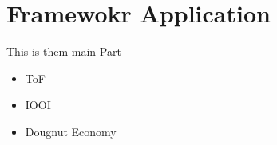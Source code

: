 \section{Framewokr Application}
\label{sec:main}

This is them main Part

\begin{itemize}
    \item ToF
    \item IOOI
    \item  Dougnut Economy
\end{itemize}